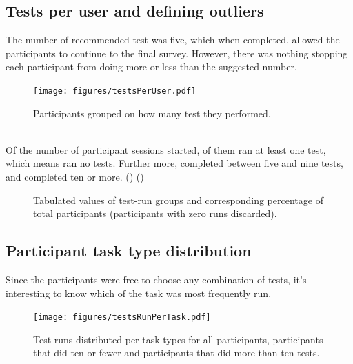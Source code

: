\documentclass[nofilelist,dvipsnames]{cslthse-msc}
\begin{document}
			\subsection{Tests per user and defining outliers}

				The number of recommended test was five, which when completed, allowed
				the participants to continue to the final survey. However, there was
				nothing stopping each participant from doing more or less than the
				suggested number.

				\begin{figure}[h!]
					\centering
					\texttt{[image: figures/testsPerUser.pdf]}
					\caption{Participants grouped on how many test they performed.}
				\end{figure}

        \ \\
        Of the  number of participant sessions started,
        of them ran at least one test, which means  ran
        no tests. Further more,  completed between
        five and nine tests, and  completed ten or
        more. () ()

        \begin{figure}
          \centering
          \caption{Tabulated values of test-run groups and corresponding
            percentage of total participants (participants with zero runs
            discarded).}
        \end{figure}

      \subsection{Participant task type distribution}

        Since the participants were free to choose any combination of tests,
        it's interesting to know which of the task was most frequently run.

				\begin{figure}[h!]
					\centering
					\texttt{[image: figures/testsRunPerTask.pdf]}
          \caption{
            Test runs distributed per task-types for all participants,
            participants that did ten or fewer and participants that did more
            than ten tests.
          }
				\end{figure}
\end{document}
